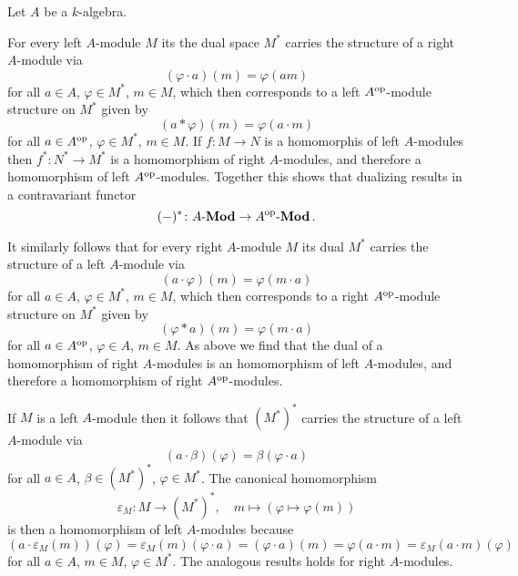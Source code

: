 \begin{example}
  Let $A$ be a $k$-algebra.
  
  For every left $A$-module $M$ its the dual space $M^*$ carries the structure of a right $A$-module via
  \[
      (\varphi \cdot a)(m)
    = \varphi(am)
  \]
  for all $a \in A$, $\varphi \in M^*$, $m \in M$, which then corresponds to a left $A^{\mathrm{op}}$-module structure on $M^*$ given by
  \[
    (a * \varphi)(m)
    = \varphi(a \cdot m)
  \]
  for all $a \in A^{\mathrm{op}}$, $\varphi \in M^*$, $m \in M$.
  If $f \colon M \to N$ is a homomorphis of left $A$-modules then $f^* \colon N^* \to M^*$ is a homomorphism of right $A$-modules, and therefore a homomorphism of left $A^{\mathrm{op}}$-modules.
  Together this shows that dualizing results in a contravariant functor
  \[
            (-)^*
    \colon  A\text{-}\mathbf{Mod}
    \to     A^{\mathrm{op}}\text{-}\mathbf{Mod} \,.
  \]
  
  It similarly follows that for every right $A$-module $M$ its dual $M^*$ carries the structure of a left $A$-module via
  \[
      (a \cdot \varphi)(m)
    = \varphi(m \cdot a)
  \]
  for all $a \in A$, $\varphi \in M^*$, $m \in M$, which then corresponds to a right $A^{\mathrm{op}}$-module structure on $M^*$ given by
  \[
      (\varphi * a)(m)
    = \varphi(m \cdot a)
  \]
  for all $a \in A^{\mathrm{op}}$, $\varphi \in A$, $m \in M$.
  As above we find that the dual of a homomorphism of right $A$-modules is an homomorphism of left $A$-modules, and therefore a homomorphism of right $A^{\mathrm{op}}$-modules.
  
  If $M$ is a left $A$-module then it follows that $(M^*)^*$ carries the structure of a left $A$-module via
  \[
      (a \cdot \beta)(\varphi)
    = \beta(\varphi \cdot a)
  \]
  for all $a \in A$, $\beta \in (M^*)^*$, $\varphi \in M^*$.
  The canonical homomorphism
  \[
            \varepsilon_M
    \colon  M
    \to     (M^*)^*,
    \quad   m
    \mapsto (\varphi \mapsto \varphi(m))
  \]
  is then a homomorphism of left $A$-modules because
  \[
      (a \cdot \varepsilon_M(m))(\varphi)
    = \varepsilon_M(m)(\varphi \cdot a)
    = (\varphi \cdot a)(m)
    = \varphi(a \cdot m)
    = \varepsilon_M(a \cdot m)(\varphi)
  \]
  for all $a \in A$, $m \in M$, $\varphi \in M^*$.
  The analogous results holds for right $A$-modules.


\end{example}
